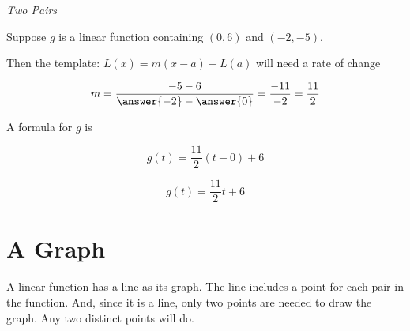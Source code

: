 \documentclass{ximera}
\begin{document}
\begin{example} \textit{Two Pairs}


Suppose $g$ is a linear function containing $(0, 6)$ and $(-2, -5)$.

Then the template: $L(x) = m (x-a) + L(a)$ will need a rate of change



\[  m = \frac{-5 - 6}{\answer{-2} - \answer{0}} = \frac{-11}{-2} = \frac{11}{2}  \]

A formula for $g$ is


\[  g(t) = \frac{11}{2} (t-0) + 6     \]


\[  g(t) = \frac{11}{2} t + 6    \]



\end{example}










\section{A Graph}




A linear function has a line as its graph.  The line includes a point for each pair in the function.  And, since it is a line, only two points are needed to draw the graph.  Any two distinct points will do.
\end{document}
